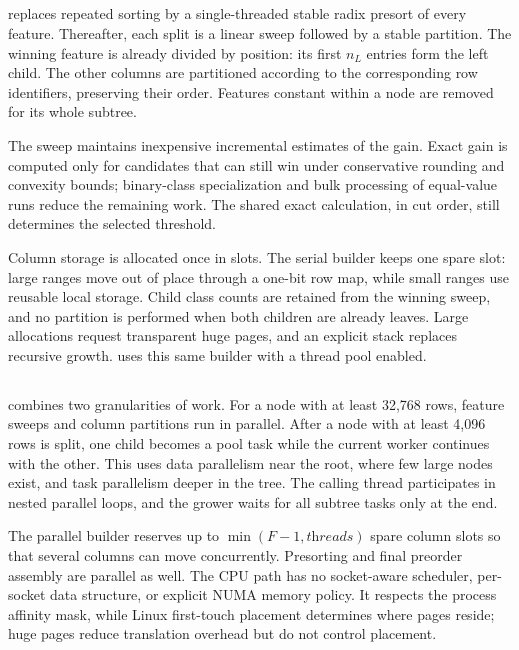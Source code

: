 \subsection{\ImplSerialOpt}

\ImplSerialOpt{} replaces repeated sorting by a single-threaded stable radix presort of every feature.  Thereafter, each split is a linear sweep followed by a stable partition.  The winning feature is already divided by position: its first \(n_L\) entries form the left child.  The other columns are partitioned according to the corresponding row identifiers, preserving their order.  Features constant within a node are removed for its whole subtree.

The sweep maintains inexpensive incremental estimates of the gain.  Exact gain is computed only for candidates that can still win under conservative rounding and convexity bounds; binary-class specialization and bulk processing of equal-value runs reduce the remaining work.  The shared exact calculation, in cut order, still determines the selected threshold.

Column storage is allocated once in slots.  The serial builder keeps one spare slot: large ranges move out of place through a one-bit row map, while small ranges use reusable local storage.  Child class counts are retained from the winning sweep, and no partition is performed when both children are already leaves.  Large allocations request transparent huge pages, and an explicit stack replaces recursive growth.  \ImplParallel{} uses this same builder with a thread pool enabled.

\subsection{\ImplParallel}

\ImplParallel{} combines two granularities of work.  For a node with at least 32,768 rows, feature sweeps and column partitions run in parallel.  After a node with at least 4,096 rows is split, one child becomes a pool task while the current worker continues with the other.  This uses data parallelism near the root, where few large nodes exist, and task parallelism deeper in the tree. The calling thread participates in nested parallel loops, and the grower waits for all subtree tasks only at the end.

The parallel builder reserves up to \(\min(F-1,\textit{threads})\) spare column slots so that several columns can move concurrently.  Presorting and final preorder assembly are parallel as well.  The CPU path has no socket-aware scheduler, per-socket data structure, or explicit NUMA memory policy.  It respects the process affinity mask, while Linux first-touch placement determines where pages reside; huge pages reduce translation overhead but do not control placement.

